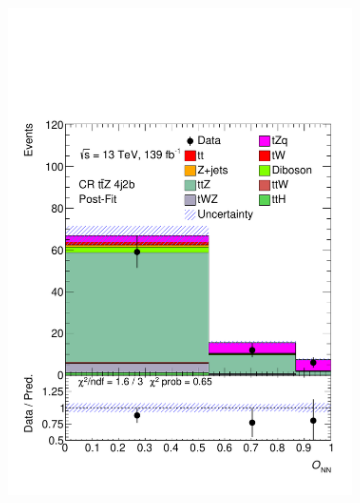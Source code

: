 \begin{figure}[!h] 
  \begin{subfigure}[b]{0.33\linewidth}
    \centering
    \includegraphics[width=\textwidth]{ubonn-thesis/Chapters/Chapters_07/Figure/Data/CR_4j2b_postFit.pdf} 
    \caption{}
  \end{subfigure}%
  \begin{subfigure}[b]{0.33\linewidth}
    \centering

\end{subfigure}
\end{figure}
